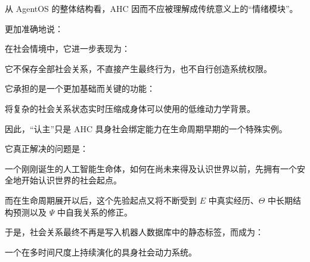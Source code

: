 从 AgentOS 的整体结构看，AHC 因而不应被理解成传统意义上的“情绪模块”。

更加准确地说：

\begin{statementbox}
\centering
{}
\end{statementbox}

在社会情境中，它进一步表现为：

\begin{statementbox}
\centering
{}
\end{statementbox}

它不保存全部社会关系，不直接产生最终行为，也不自行创造系统权限。

它承担的是一个更加基础而关键的功能：

\begin{statementbox}
将复杂的社会关系状态实时压缩成身体可以使用的低维动力学背景。
\end{statementbox}

因此，“认主”只是 AHC 具身社会绑定能力在生命周期早期的一个特殊实例。

它真正解决的问题是：

\begin{statementbox}
一个刚刚诞生的人工智能生命体，如何在尚未来得及认识世界以前，先拥有一个安全地开始认识世界的社会起点。
\end{statementbox}

而在生命周期展开以后，这个先验起点又将不断受到 $E$ 中真实经历、$\Theta$ 中长期结构预测以及 $\Psi$ 中自我关系的修正。

于是，社会关系最终不再是写入机器人数据库中的静态标签，而成为：

\begin{statementbox}
一个在多时间尺度上持续演化的具身社会动力系统。
\end{statementbox}
